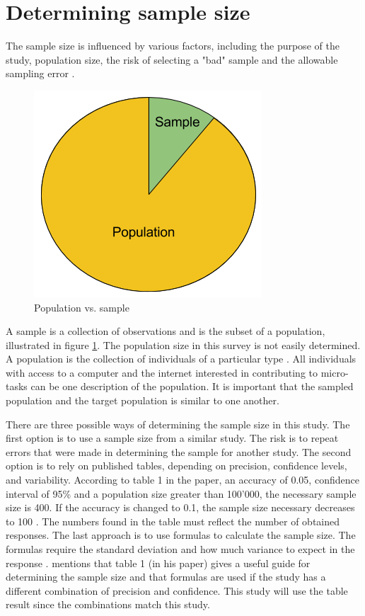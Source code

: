 \section[Sample Size]{Determining sample size}\label{sec:samplesize}
The sample size is influenced by various factors, including the purpose of the study, population size, the risk of selecting a "bad" sample and the allowable sampling error \citep{Israel1992}. 

\begin{figure}[h]
	\centering
	\includegraphics[width=0.35\linewidth]{fig/popsample}
	\caption{Population vs. sample}
	\label{fig:popsample}
\end{figure}

A sample is a collection of observations and is the subset of a population, illustrated in figure \ref{fig:popsample}. The population size in this survey is not easily determined. A population is the collection of individuals of a particular type \citep{Walpole2012}. All individuals with access to a computer and the internet interested in contributing to micro-tasks can be one description of the population. It is important that the sampled population and the target population is similar to one another.

There are three possible ways of determining the sample size in this study. The first option is to use a sample size from a similar study. The risk is to repeat errors that were made in determining the sample for another study. The second option is to rely on published tables, depending on precision, confidence levels, and variability. According to table 1 in the \cite{Israel1992} paper, an accuracy of 0.05, confidence interval of 95\% and a population size greater than 100'000, the necessary sample size is 400. If the accuracy is changed to 0.1, the sample size necessary decreases to 100 \citep{Israel1992}. The numbers found in the table must reflect the number of obtained responses. The last approach is to use formulas to calculate the sample size. The formulas require the standard deviation and how much variance to expect in the response \citep{Israel1992, Smith2013}. \cite{Israel1992} mentions that table 1 (in his paper) gives a useful guide for determining the sample size and that formulas are used if the study has a different combination of precision and confidence. This study will use the table result since the combinations match this study.

